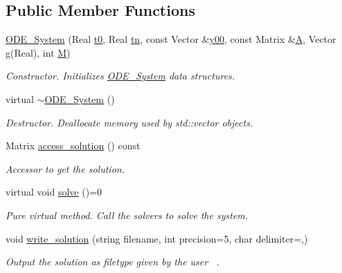 \subsection*{Public Member Functions}
\begin{DoxyCompactItemize}
\item 
\mbox{\label{class_o_d_e___system_a0d26d35aa660c12699438ef46ae6cb1f}} 
\mbox{\hyperlink{class_o_d_e___system_a0d26d35aa660c12699438ef46ae6cb1f}{O\+D\+E\+\_\+\+System}} (Real \mbox{\hyperlink{class_o_d_e___system_a1947b357608babc98c5e79d645e24c3c}{t0}}, Real \mbox{\hyperlink{class_o_d_e___system_a5c5a0dd9f04dfb8d8a84d49b741773af}{tn}}, const Vector \&\mbox{\hyperlink{class_o_d_e___system_a1379137a4480e5861fd1911bc061f908}{y00}}, const Matrix \&\mbox{\hyperlink{class_o_d_e___system_a632009677e80b62a1996e842398bf8b6}{A}}, Vector \mbox{\hyperlink{class_o_d_e___system_a2dee2a4b3468547c3ddab15edfc8ddfd}{g}}(Real), int \mbox{\hyperlink{class_o_d_e___system_a46e5ee402ffc7c500dccad753a1fba36}{M}})
\begin{DoxyCompactList}\small\item\em Constructor. Initializes \mbox{\hyperlink{class_o_d_e___system}{O\+D\+E\+\_\+\+System}} data structures. \end{DoxyCompactList}\item 
\mbox{\label{class_o_d_e___system_a1d38890ff0950344d4d34b9fab6a956b}} 
virtual \mbox{\hyperlink{class_o_d_e___system_a1d38890ff0950344d4d34b9fab6a956b}{$\sim$\+O\+D\+E\+\_\+\+System}} ()
\begin{DoxyCompactList}\small\item\em Destructor. Deallocate memory used by std\+::vector objects. \end{DoxyCompactList}\item 
\mbox{\label{class_o_d_e___system_aebb5a7971ef1c429077155eec549f713}} 
Matrix \mbox{\hyperlink{class_o_d_e___system_aebb5a7971ef1c429077155eec549f713}{access\+\_\+solution}} () const
\begin{DoxyCompactList}\small\item\em Accessor to get the solution. \end{DoxyCompactList}\item 
virtual void \mbox{\hyperlink{class_o_d_e___system_a78a058382148b745fa458f0b9f52f47c}{solve}} ()=0
\begin{DoxyCompactList}\small\item\em Pure virtual method. Call the solvers to solve the system. \end{DoxyCompactList}\item 
void \mbox{\hyperlink{class_o_d_e___system_a89537c37978b13e3540976bcb7fc603f}{write\+\_\+solution}} (string filename, int precision=5, char delimiter=\textquotesingle{},\textquotesingle{})
\begin{DoxyCompactList}\small\item\em Output the solution as filetype given by the user~\newline
. \end{DoxyCompactList}\end{DoxyCompactItemize}
